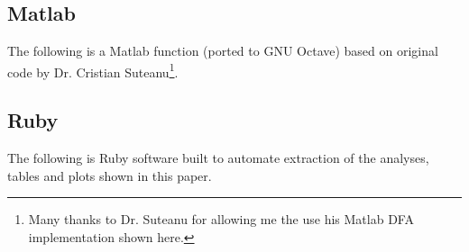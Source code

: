
\subsection{Matlab}\label{SourceCodeMatlab}
The following is a Matlab function (ported to GNU Octave) based on original code by Dr. Cristian Suteanu\footnote{Many thanks to Dr. Suteanu for allowing me the use his Matlab DFA implementation shown here.}.
 


\subsection{Ruby}
The following is Ruby software built to automate extraction of the analyses, tables and plots shown in this paper.

